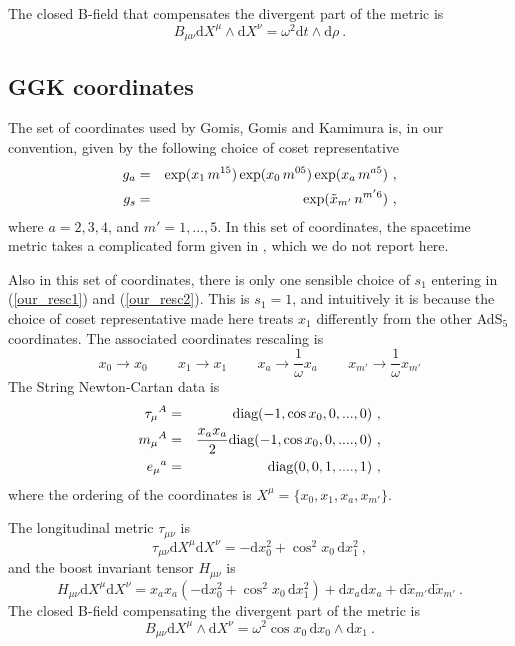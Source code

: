 \documentclass[12pt]{article}
\def\dd{\text{d}}
\numberwithin{equation}{section}
\begin{document}
\begin{appendices}
The closed B-field that compensates the divergent part of the metric is 
\begin{equation}
B_{\mu\nu} \dd X^{\mu} \wedge \dd X^{\nu} = \omega^2 \dd t \wedge \dd \rho \ . 
\end{equation}


\subsection{GGK coordinates}

The set of coordinates used by Gomis, Gomis and Kamimura \cite{Gomis:2005pg} is, in our convention,  given by the following choice of coset representative 
\begin{eqnarray}
\label{GGK_coset}
\notag
g_a &=& \exp ( x_1 \, m^{15} ) \exp ( x_0 \,m^{05}) \exp(x_a \,m^{a5}) \ , \\
g_s &=& \exp( \tilde{x}_{m'} \,n^{m'6} ) \ ,
\end{eqnarray}
where $a = 2, 3, 4$, and $m' = 1, ..., 5$. 
In this set of coordinates, the spacetime metric takes a complicated form given in \cite{Gomis:2005pg}, which we do not report here. 

Also in this set of coordinates, there is only one sensible choice of $s_1$ entering in (\ref{our_resc1}) and (\ref{our_resc2}). This is $s_1 = 1$, and intuitively it is because the choice of coset representative made here treats $x_1$ differently from the other AdS$_5$ coordinates.  The associated coordinates rescaling is 
\begin{equation}
x_0 \rightarrow x_0 \, \qquad
x_1 \rightarrow x_1\, \qquad
x_a \rightarrow \frac{1}{\omega} x_a \, \qquad
x_{m'} \rightarrow  \frac{1}{\omega} x_{m'} 
\end{equation}
The String Newton-Cartan data is 
\begin{eqnarray}
\notag
\tau_{\mu}{}^A &=& \text{diag} ( -1,  \cos x_0, 0, ..., 0) \ ,  \\
m_{\mu}{}^A &=& \frac{x_a x_a}{2} \text{diag} (-1,  \cos x_0, 0, ...., 0) \ , \\
\notag
e_{\mu}{}^a &=&\text{diag} (0,  0, 1, ...., 1) \ ,
\end{eqnarray}
where the ordering of the coordinates is $X^{\mu} = \{x_0, x_1, x_a, x_{m'}\}$. 

The longitudinal metric $\tau_{\mu\nu}$ is 
\begin{equation}
\tau_{\mu\nu} \dd X^{\mu} \dd X^{\nu} =  - \dd x_0^2 + \cos^2 x_0\, \dd x_1^2\ ,
\end{equation}
and the boost invariant tensor $H_{\mu\nu}$ is 
\begin{equation}
H_{\mu\nu} \dd X^{\mu} \dd X^{\nu} =  x_ax_a (-\dd x_0^2 + \cos^2x_0\, \dd x_1^2 )+ \dd x_a \dd x_a + \dd \tilde{x}_{m'} \dd \tilde{x}_{m'}\ .
\end{equation}
The closed B-field compensating the divergent part of the metric is 
\begin{equation}
B_{\mu\nu} \dd X^{\mu} \wedge \dd X^{\nu} = \omega^2 \cos x_0 \, \dd x_0 \wedge\dd x_1 \ . 
\end{equation}



\end{appendices}
\end{document}
